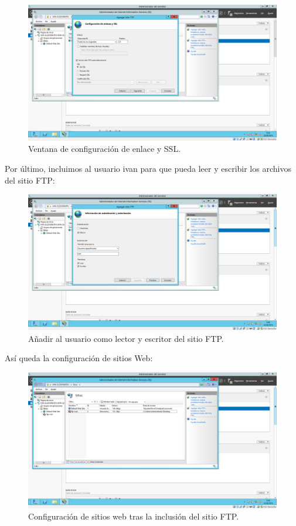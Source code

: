 \begin{itemize}
\begin{itemize}
		\begin{figure}[H]
			\centering
			\includegraphics[width=0.7\linewidth]{ConfiguracionSSL}
			\caption[Configuración SSL]{Ventana de configuración de enlace y SSL.}
			\label{fig:ConfiguraciónSSL}
		\end{figure}
	 
	 Por último, incluimos al usuario ivan para que pueda leer y escribir los archivos del sitio FTP:\\
	 
	 \begin{figure}[H]
			\centering
			\includegraphics[width=0.7\linewidth]{PermisosFTP}
			\caption[Permisos FTP]{Añadir al usuario como lector y escritor del sitio FTP.}
			\label{fig:PermisosFTP}
		\end{figure}

		Así queda la configuración de sitios Web:\\
			
		\begin{figure}[H]
			\centering
			\includegraphics[width=0.7\linewidth]{ConfiguracionSitiosFinal}
			\caption[Configuracion sitios web final]{Configuración de sitios web tras la inclusión del sitio FTP.}
			\label{fig:ConfiguracionSitiosFinal}
		\end{figure}
		

\end{itemize}
\end{itemize}
